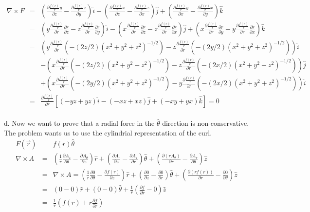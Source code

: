 \documentclass[11pt]{amsart}
\begin{document}
\begin{eqnarray*} 
\nabla \times F &=& (\frac{\partial{\frac{f(r)}{r}y}}{\partial{z}}-\frac{\partial{\frac{f(r)}{r}z}}{\partial{y}})\hat{i}-(\frac{\partial{\frac{f(r)}{r}x}}{\partial{z}}-\frac{\partial{\frac{f(r)}{r}z}}{\partial{x}})\hat{j}+(\frac{\partial{\frac{f(r)}{r}y}}{\partial{x}}-\frac{\partial{\frac{f(r)}{r}x}}{\partial{y}})\hat{k} \\
&=&(y\frac{\partial{\frac{f(r)}{r}}}{\partial{r}}\frac{\partial{r}}{\partial{z}}-z\frac{\partial{\frac{f(r)}{r}}}{\partial{r}}\frac{\partial{r}}{\partial{y}})\hat{i}-(x\frac{\partial{\frac{f(r)}{r}}}{\partial{r}}\frac{\partial{r}}{\partial{z}}-z\frac{\partial{\frac{f(r)}{r}}}{\partial{r}}\frac{\partial{r}}{\partial{x}})\hat{j}+(x\frac{\partial{\frac{f(r)}{r}}}{\partial{r}}\frac{\partial{r}}{\partial{y}}-y\frac{\partial{\frac{f(r)}{r}}}{\partial{r}}\frac{\partial{r}}{\partial{x}})\hat{k} \\
&=&(y\frac{\partial{\frac{f(r)}{r}}}{\partial{r}}(-(2z/2)(x^{2}+y^{2}+z^{2})^{-1/2})-z\frac{\partial{\frac{f(r)}{r}}}{\partial{r}}(-(2y/2)(x^{2}+y^{2}+z^{2})^{-1/2}))\hat{i} \\
& & -(x\frac{\partial{\frac{f(r)}{r}}}{\partial{r}}(-(2z/2)(x^{2}+y^{2}+z^{2})^{-1/2})-z\frac{\partial{\frac{f(r)}{r}}}{\partial{r}}(-(2x/2)(x^{2}+y^{2}+z^{2})^{-1/2}))\hat{j} \\
& & +(x\frac{\partial{\frac{f(r)}{r}}}{\partial{r}}(-(2y/2)(x^{2}+y^{2}+z^{2})^{-1/2})-y\frac{\partial{\frac{f(r)}{r}}}{\partial{r}}(-(2x/2)(x^{2}+y^{2}+z^{2})^{-1/2}))\hat{i} \\
&=& \frac{\partial{\frac{f(r)}{r}}}{\partial{r}}[(-yz+yz)\hat{i}-(-xz+xz)\hat{j}+(-xy+yx)\hat{k}] = 0 
\end{eqnarray*} \\
d. Now we want to prove that a radial force in the $\hat{\theta}$ direction is non-conservative. The problem wants us to use the cylindrial representation of the curl. \\
\begin{eqnarray*}
F(\vec{r}) &=& f(r)\hat{\theta} \\
\nabla \times A &=& (\frac{1}{r}\frac{\partial{A_{z}}}{\partial{\theta}}-\frac{\partial{A_{\theta}}}{\partial{z}})\hat{r}+(\frac{\partial{A_{r}}}{\partial{z}}-\frac{\partial{A_{z}}}{\partial{r}})\hat{\theta}+(\frac{\partial{(rA_{\theta})}}{\partial{r}}-\frac{\partial{A_{r}}}{\partial{\theta}})\hat{z}  \\
&=& \nabla \times A = (\frac{1}{r}\frac{\partial{0}}{\partial{\theta}}-\frac{\partial{f(r)}}{\partial{z}})\hat{r}+(\frac{\partial{0}}{\partial{z}}-\frac{\partial{0}}{\partial{r}})\hat{\theta}+(\frac{\partial{(rf(r))}}{\partial{r}}-\frac{\partial{0}}{\partial{\theta}})\hat{z} \\
&=& (0-0)\hat{r}+(0-0)\hat{\theta}+\frac{1}{r}(\frac{\partial{f}}{\partial{r}}-0)\hat{z} \\
&=& \frac{1}{r}(f(r)+r\frac{\partial{f}}{\partial{r}}) 
\end{eqnarray*} \\
\end{document}
